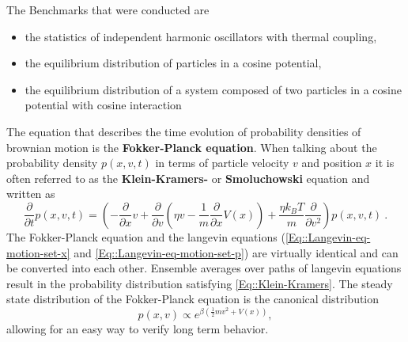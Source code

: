 	The Benchmarks that were conducted are
	\begin{itemize}
		\item the statistics of independent harmonic oscillators with thermal coupling,
		\item the equilibrium distribution of particles in a cosine potential,
		\item the equilibrium distribution of a system composed of two particles in a cosine potential with cosine interaction
	\end{itemize}
	The equation that describes the time evolution of probability densities of brownian motion is the \textbf{Fokker-Planck equation}. When talking about the probability density $p(x, v, t)$ in terms of particle velocity $v$ and position $x$ it is often referred to as the \textbf{Klein-Kramers-} or \textbf{Smoluchowski} equation and written as
	\begin{equation} \label{Eq::Klein-Kramers}
		\frac{\partial}{\partial t} p(x, v, t) = \left(-\frac{\partial}{\partial x} v + \frac{\partial}{\partial v} \left(\eta v - \frac{1}{m} \frac{\partial}{\partial x} V(x) \right) + \frac{\eta k_B T}{m} \frac{\partial}{\partial v^2}\right)p(x, v, t) ~.
	\end{equation}
	The Fokker-Planck equation and the langevin equations (\autoref{Eq::Langevin-eq-motion-set-x} and \autoref{Eq::Langevin-eq-motion-set-p}) are virtually identical and can be converted into each other. Ensemble averages over paths of langevin equations result in the probability distribution satisfying \autoref{Eq::Klein-Kramers}. The steady state distribution of the Fokker-Planck equation is the canonical distribution
	\begin{equation} \label{Eq::Canonical-Dist}
		p(x, v) \propto e^{\beta \left( \tfrac{1}{2} m v^2 + V(x)\right)},
	\end{equation}
	allowing for an easy way to verify long term behavior.
